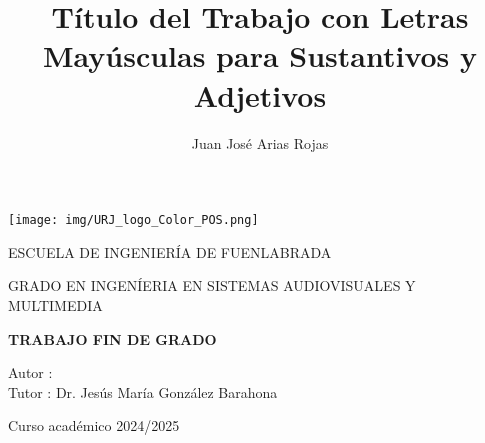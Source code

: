 \documentclass[a4paper, 12pt]{book}
\title{Título del Trabajo con Letras Mayúsculas para Sustantivos y Adjetivos}
\author{Juan José Arias Rojas}
\makeatletter
\let\thetitle\@title
\let\theauthor\@author
\makeatother
\begin{document}
\renewcommand{\refname}{Bibliografía}  %
\renewcommand{\appendixname}{Apéndice}



\begin{titlepage}
	\begin{center}
		\texttt{[image: img/URJ\_logo\_Color\_POS.png]}

		\vspace{1.75cm}

		\LARGE
		ESCUELA DE INGENIERÍA DE FUENLABRADA
		\vspace{1cm}

		\LARGE
		GRADO EN INGENÍERIA EN SISTEMAS AUDIOVISUALES Y MULTIMEDIA

		\vspace{1cm}
		\LARGE
		\textbf{TRABAJO FIN DE GRADO}

		\vspace{2cm}

		\Large
		\MakeUppercase{\thetitle}

		\vspace{2cm}

		\large
		Autor : \theauthor \\
		Tutor : Dr. Jesús María González Barahona\\
		\vspace{1cm}

		\large
		Curso académico 2024/2025

	\end{center}
\end{titlepage}

\newpage
\mbox{}
\thispagestyle{empty} %



\clearpage
{}
\chapter*{}

\vspace{12cm}
\end{document}
